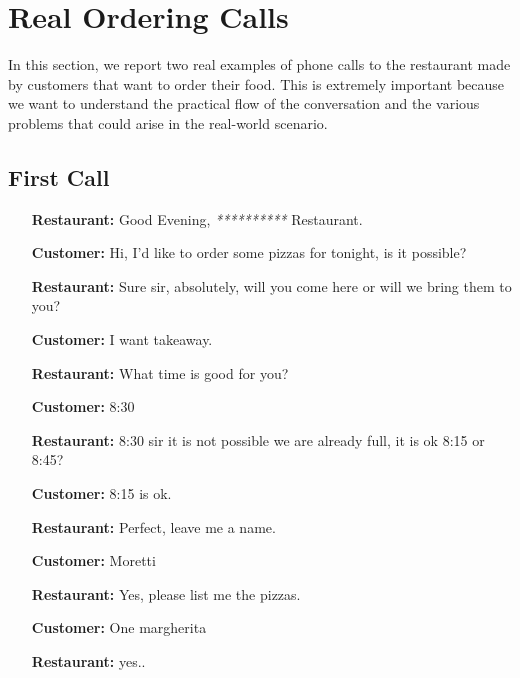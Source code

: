 \section{Real Ordering Calls}

In this section, we report two real examples of phone calls to the restaurant made by
customers that want to order their food. This is extremely important because we want
to understand the practical flow of the conversation and the various problems that
could arise in the real-world scenario.

\subsection*{First Call}

\begin{itemize}

\item[\textbf{Restaurant:}] Good Evening, \textit{**********} Restaurant.

\item[\textbf{Customer:}] Hi, I'd like to order some pizzas for tonight, is it possible? 

\item[\textbf{Restaurant:}] Sure sir, absolutely, will you come here or will we bring them to you? 

\item[\textbf{Customer:}] I want takeaway.

\item[\textbf{Restaurant:}] What time is good for you? 

\item[\textbf{Customer:}]  8:30

\item[\textbf{Restaurant:}] 8:30 sir it is not possible we are already full, it is ok 8:15 or 8:45? 

\item[\textbf{Customer:}] 8:15 is ok. 

\item[\textbf{Restaurant:}] Perfect, leave me a name. 

\item[\textbf{Customer:}] Moretti

\item[\textbf{Restaurant:}] Yes, please list me the pizzas.

\item[\textbf{Customer:}]  One margherita

\item[\textbf{Restaurant:}] yes..


\end{itemize}
